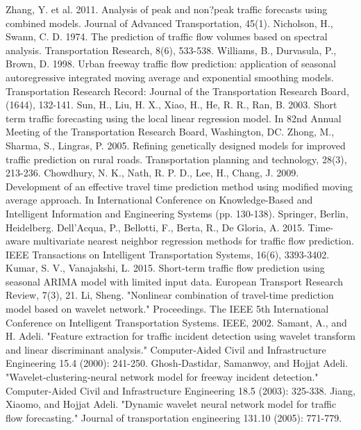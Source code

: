\documentclass[a4paper, 10pt, conference]{ieeeconf}      %
\begin{document}
\begin{thebibliography}{00}
 Zhang, Y. et al. 2011. Analysis of peak and non?peak traffic forecasts using combined models. Journal of Advanced Transportation, 45(1).
 Nicholson, H., Swann, C. D. 1974. The prediction of traffic flow volumes based on spectral analysis. Transportation Research, 8(6), 533-538.
 Williams, B., Durvasula, P., Brown, D. 1998. Urban freeway traffic flow prediction: application of seasonal autoregressive integrated moving average and exponential smoothing models. Transportation Research Record: Journal of the Transportation Research Board, (1644), 132-141.
 Sun, H., Liu, H. X., Xiao, H., He, R. R., Ran, B. 2003. Short term traffic forecasting using the local linear regression model. In 82nd Annual Meeting of the Transportation Research Board, Washington, DC.
 Zhong, M., Sharma, S., Lingras, P. 2005. Refining genetically designed models for improved traffic prediction on rural roads. Transportation planning and technology, 28(3), 213-236.
 Chowdhury, N. K., Nath, R. P. D., Lee, H., Chang, J. 2009. Development of an effective travel time prediction method using modified moving average approach. In International Conference on Knowledge-Based and Intelligent Information and Engineering Systems (pp. 130-138). Springer, Berlin, Heidelberg.
 Dell'Acqua, P., Bellotti, F., Berta, R., De Gloria, A. 2015. Time-aware multivariate nearest neighbor regression methods for traffic flow prediction. IEEE Transactions on Intelligent Transportation Systems, 16(6), 3393-3402.
 Kumar, S. V., Vanajakshi, L. 2015. Short-term traffic flow prediction using seasonal ARIMA model with limited input data. European Transport Research Review, 7(3), 21.
 Li, Sheng. "Nonlinear combination of travel-time prediction model based on wavelet network." Proceedings. The IEEE 5th International Conference on Intelligent Transportation Systems. IEEE, 2002.
 Samant, A., and H. Adeli. "Feature extraction for traffic incident detection using wavelet transform and linear discriminant analysis." Computer‐Aided Civil and Infrastructure Engineering 15.4 (2000): 241-250.
 Ghosh‐Dastidar, Samanwoy, and Hojjat Adeli. "Wavelet‐clustering‐neural network model for freeway incident detection." Computer‐Aided Civil and Infrastructure Engineering 18.5 (2003): 325-338.
 Jiang, Xiaomo, and Hojjat Adeli. "Dynamic wavelet neural network model for traffic flow forecasting." Journal of transportation engineering 131.10 (2005): 771-779.

\end{thebibliography}
\end{document}
